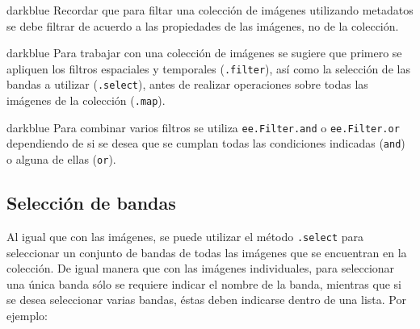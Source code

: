 \documentclass[
  12pt,
  letterpaper,
  twoside]{book}
\begin{document}
\begin{bluebox2}

\begin{awesomeblock}{5pt}{\faLightbulb}{darkblue}
Recordar que para filtar una colección de imágenes utilizando metadatos se debe filtrar de acuerdo a las propiedades de las imágenes, no de la colección.

\end{awesomeblock}

\end{bluebox2}

\begin{bluebox2}

\begin{awesomeblock}{5pt}{\faLightbulb}{darkblue}
Para trabajar con una colección de imágenes se sugiere que primero se apliquen los filtros espaciales y temporales (\texttt{.filter}), así como la selección de las bandas a utilizar (\texttt{.select}), antes de realizar operaciones sobre todas las imágenes de la colección (\texttt{.map}).

\end{awesomeblock}

\end{bluebox2}

\begin{bluebox2}

\begin{awesomeblock}{5pt}{\faLightbulb}{darkblue}
Para combinar varios filtros se utiliza \texttt{ee.Filter.and} o \texttt{ee.Filter.or} dependiendo de si se desea que se cumplan todas las condiciones indicadas (\texttt{and}) o alguna de ellas (\texttt{or}).

\end{awesomeblock}

\end{bluebox2}

\hypertarget{selecciuxf3n-de-bandas-1}{%
\subsection*{Selección de bandas}\label{selecciuxf3n-de-bandas-1}}

Al igual que con las imágenes, se puede utilizar el método \texttt{.select} para seleccionar un conjunto de bandas de todas las imágenes que se encuentran en la colección. De igual manera que con las imágenes individuales, para seleccionar una única banda sólo se requiere indicar el nombre de la banda, mientras que si se desea seleccionar varias bandas, éstas deben indicarse dentro de una lista. Por ejemplo:
\end{document}
